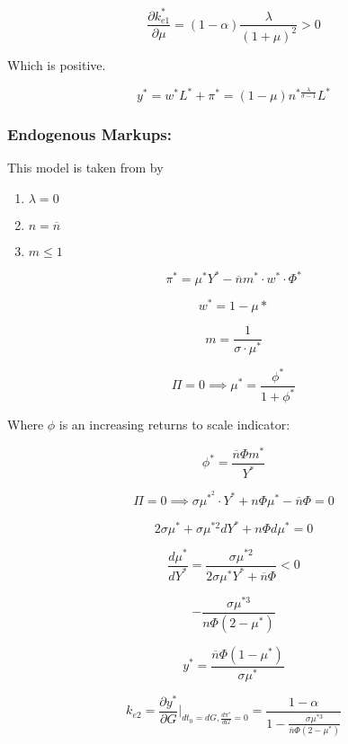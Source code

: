 $$
\frac{\partial k^*_{e1}}{\partial \mu}=(1-\alpha)\frac{\lambda}{(1+\mu)^2}>0
$$

Which is positive. 

$$
y^*=w^*L^*+\pi^*=(1-\mu)n^{*\frac{\lambda}{\sigma-1}}L^*
$$


\subsubsection{Endogenous Markups: \cite{costa_endogenous_2004}}
This model is taken from  by \textcite{costa_endogenous_2004}


\begin{enumerate}
    \item $ \lambda = 0$
    \item $n = \overline{n}$
    \item $m \leq 1$ 
\end{enumerate}


$$
\pi^* = \mu^*Y^* - \overline{n}m^* \cdot w^*  \cdot \Phi^*
$$


$$
w^*= 1 - \mu*
$$

$$
m = \frac{1}{\sigma \cdot \mu^*}
$$

$$
\Pi = 0 \implies \mu^* = \frac{\phi^*}{1 + \phi^*}
$$

Where $\phi$ is an increasing returns to scale indicator:

$$
\phi^* = \frac{\overline{n} \Phi m^*}{Y^*}
$$

$$
\Pi = 0 \implies \sigma \mu^{*^2} \cdot Y^* + n \Phi\mu^* - \overline{n}\Phi = 0
$$

$$
2\sigma\mu^* + \sigma\mu^{*2}dY^*+n\Phi d\mu^*=0
$$

$$
\frac{d\mu^*}{dY^*}=\frac{\sigma\mu^{*2}}{2\sigma\mu^*Y^*+\overline{n}\Phi}<0
$$

$$
-\frac{\sigma\mu^{*3}}{n\Phi(2-\mu^*)}
$$


$$
y^*=\frac{\overline{n}\Phi(1-\mu^*)}{\sigma\mu^*}
$$


\begin{equation}\tag{$m^*_e2$}
k_{e2}=\frac{\partial y^*}{\partial G}\bigg\rvert_{dt_{0}=dG, \frac{d \pi^*}{dG}=0}=\frac{1-\alpha}{1-\frac{\sigma\mu^{*3}}{\overline{n}\Phi(2-\mu^*)}}
\end{equation}





